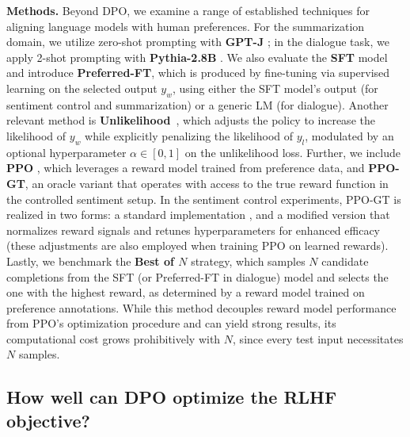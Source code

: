 \textbf{Methods.} Beyond DPO, we examine a range of established techniques for aligning language models with human preferences. For the summarization domain, we utilize zero-shot prompting with \textbf{GPT-J} \citep{gpt-j}; in the dialogue task, we apply 2-shot prompting with \textbf{Pythia-2.8B} \citep{biderman2023pythia}. We also evaluate the \textbf{SFT} model and introduce \textbf{Preferred-FT}, which is produced by fine-tuning via supervised learning on the selected output $y_w$, using either the SFT model’s output (for sentiment control and summarization) or a generic LM (for dialogue). Another relevant method is \textbf{Unlikelihood}~\citep{welleck2019neural}, which adjusts the policy to increase the likelihood of $y_w$ while explicitly penalizing the likelihood of $y_l$, modulated by an optional hyperparameter $\alpha\in[0,1]$ on the unlikelihood loss. Further, we include \textbf{PPO} \citep{schulman2017proximal}, which leverages a reward model trained from preference data, and \textbf{PPO-GT}, an oracle variant that operates with access to the true reward function in the controlled sentiment setup. In the sentiment control experiments, PPO-GT is realized in two forms: a standard implementation \cite{leandro_von_werra_2023_7790115}, and a modified version that normalizes reward signals and retunes hyperparameters for enhanced efficacy (these adjustments are also employed when training PPO on learned rewards). Lastly, we benchmark the \textbf{Best of $N$} strategy, which samples $N$ candidate completions from the SFT (or Preferred-FT in dialogue) model and selects the one with the highest reward, as determined by a reward model trained on preference annotations. While this method decouples reward model performance from PPO’s optimization procedure and can yield strong results, its computational cost grows prohibitively with $N$, since every test input necessitates $N$ samples.

\subsection{How well can DPO optimize the RLHF objective?}

